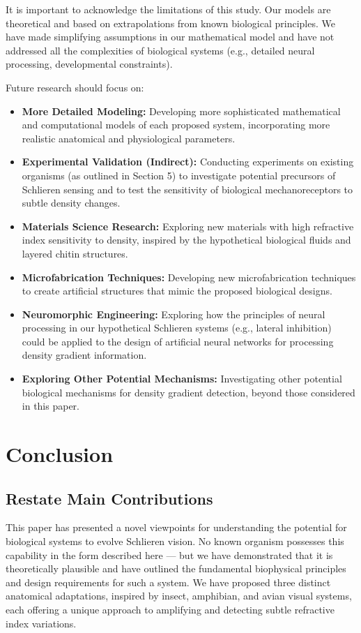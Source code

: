 \documentclass[11pt]{article}
\begin{document}
It is important to acknowledge the limitations of this study. Our models are theoretical and based on extrapolations from known biological principles. We have made simplifying assumptions in our mathematical model and have not addressed all the complexities of biological systems (e.g., detailed neural processing, developmental constraints).

Future research should focus on:
\begin{itemize}
    \item \textbf{More Detailed Modeling:} Developing more sophisticated mathematical and computational models of each proposed system, incorporating more realistic anatomical and physiological parameters.
    \item \textbf{Experimental Validation (Indirect):} Conducting experiments on existing organisms (as outlined in Section 5) to investigate potential precursors of Schlieren sensing and to test the sensitivity of biological mechanoreceptors to subtle density changes.
    \item \textbf{Materials Science Research:} Exploring new materials with high refractive index sensitivity to density, inspired by the hypothetical biological fluids and layered chitin structures.
    \item \textbf{Microfabrication Techniques:} Developing new microfabrication techniques to create artificial structures that mimic the proposed biological designs.
    \item \textbf{Neuromorphic Engineering:} Exploring how the principles of neural processing in our hypothetical Schlieren systems (e.g., lateral inhibition) could be applied to the design of artificial neural networks for processing density gradient information.
    \item \textbf{Exploring Other Potential Mechanisms:} Investigating other potential biological mechanisms for density gradient detection, beyond those considered in this paper.
\end{itemize}

\section{Conclusion}

\subsection{Restate Main Contributions}

This paper has presented a novel viewpoints for understanding the potential for biological systems to evolve Schlieren vision. No known organism possesses this capability in the form described here — but we have demonstrated that it is theoretically plausible and have outlined the fundamental biophysical principles and design requirements for such a system. We have proposed three distinct anatomical adaptations, inspired by insect, amphibian, and avian visual systems, each offering a unique approach to amplifying and detecting subtle refractive index variations.
\end{document}
